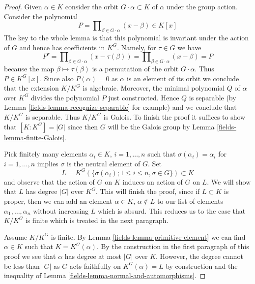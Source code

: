 \begin{proof}

Given $\alpha \in K$ consider the orbit $G \cdot \alpha \subset K$
of $\alpha$ under the group action. Consider the polynomial
$$
P = \prod\nolimits_{\beta \in G \cdot \alpha} (x - \beta) \in K[x]
$$
The key to the whole lemma is that this polynomial is invariant
under the action of $G$ and hence has coefficients in $K^G$.
Namely, for $\tau \in G$ we have
$$
P^\tau = \prod\nolimits_{\beta \in G \cdot \alpha} (x - \tau(\beta)) =
\prod\nolimits_{\beta \in G \cdot \alpha} (x - \beta) = P
$$
because the map $\beta \mapsto \tau(\beta)$ is a permutation of
the orbit $G \cdot \alpha$. Thus $P \in K^G[x]$. Since also
$P(\alpha) = 0$ as $\alpha$ is an element of its orbit
we conclude that the extension $K/K^G$ is algebraic. Moreover,
the minimal polynomial $Q$ of $\alpha$ over $K^G$ divides the
polynomial $P$ just constructed. Hence $Q$ is separable
(by Lemma \ref{fields-lemma-recognize-separable} for example) and
we conclude that $K/K^G$ is separable. Thus $K/K^G$ is Galois.
To finish the proof it suffices to show that $[K : K^G] = |G|$
since then $G$ will be the Galois group by
Lemma \ref{fields-lemma-finite-Galois}.

\medskip\noindent
Pick finitely many elements $\alpha_i \in K$, $i = 1, \ldots, n$
such that $\sigma(\alpha_i) = \alpha_i$ for $i = 1, \ldots, n$ implies
$\sigma$ is the neutral element of $G$. Set
$$
L = K^G(\{\sigma(\alpha_i); 1 \leq i \leq n, \sigma \in G\}) \subset K
$$
and observe that the action of $G$ on $K$ induces an action of $G$ on $L$.
We will show that $L$ has degree $|G|$ over $K^G$. This will finish the
proof, since if $L \subset K$ is proper, then we can add an element
$\alpha \in K$, $\alpha \not \in L$ to our list of elements
$\alpha_1, \ldots, \alpha_n$ without increasing $L$ which is absurd.
This reduces us to the case that $K/K^G$ is finite which is
treated in the next paragraph.

\medskip\noindent
Assume $K/K^G$ is finite. By Lemma \ref{fields-lemma-primitive-element}
we can find $\alpha \in K$ such that $K = K^G(\alpha)$.
By the construction in the first paragraph of this proof we see
that $\alpha$ has degree at most $|G|$ over $K$. However, the
degree cannot be less than $|G|$ as $G$ acts faithfully on
$K^G(\alpha) = L$ by construction and the inequality of
Lemma \ref{fields-lemma-normal-and-automorphisms}.
\end{proof}

